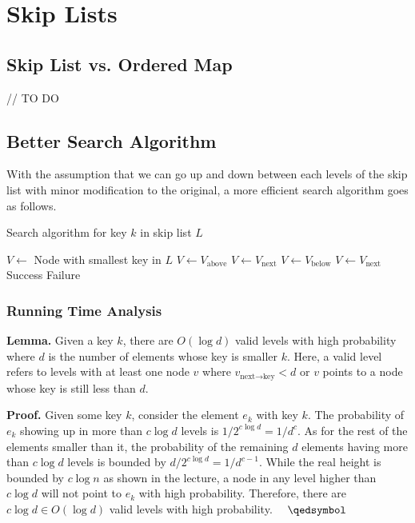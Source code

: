 \section{Skip Lists}

\subsection{Skip List vs. Ordered Map}

// TO DO

\subsection{Better Search Algorithm}

With the assumption that we can go up and down between each levels of the skip list with minor modification to the original, a more efficient search algorithm goes as follows.

\begin{algorithm}
\caption{Search algorithm for key $k$ in skip list $L$}
\begin{algorithmic}[1]
	\State $V \gets$ Node with smallest key in $L$
	 
			\State $V \gets V_\text{above}$
		\EndWhile
		\State $V \gets V_\text{next}$
	\EndWhile
	 
		\State $V \gets V_\text{below}$
			\State $V \gets V_\text{next}$
		\EndWhile
	\EndWhile
		\State \Return Success
	\Else
		\State \Return Failure
	\EndIf
\EndProcedure
\end{algorithmic}
\end{algorithm}

\subsubsection{Running Time Analysis}

\begin{tcolorbox}
\textbf{Lemma.} Given a key $k$, there are $O(\log d)$ valid levels with high probability where $d$ is the number of elements whose key is smaller $k$.
Here, a valid level refers to levels with at least one node $v$ where $v_\text{next$\to$key} < d$ or $v$ points to a node whose key is still less than $d$.

\textbf{Proof.} Given some key $k$, consider the element $e_k$ with key $k$. The probability of $e_k$ showing up in more than $c\log d$ levels is $1/2^{c\log d} = 1/d^c$.
As for the rest of the elements smaller than it, the probability of the remaining $d$ elements having more than $c\log d$ levels is bounded by $d/2^{c\log d} = 1/d^{c-1}$.
While the real height is bounded by $c\log n$ as shown in the lecture, a node in any level higher than $c\log d$ will not point to $e_k$ with high probability.
Therefore, there are $c\log d \in O(\log d)$ valid levels with high probability. $\quad\qedsymbol$
\end{tcolorbox}

